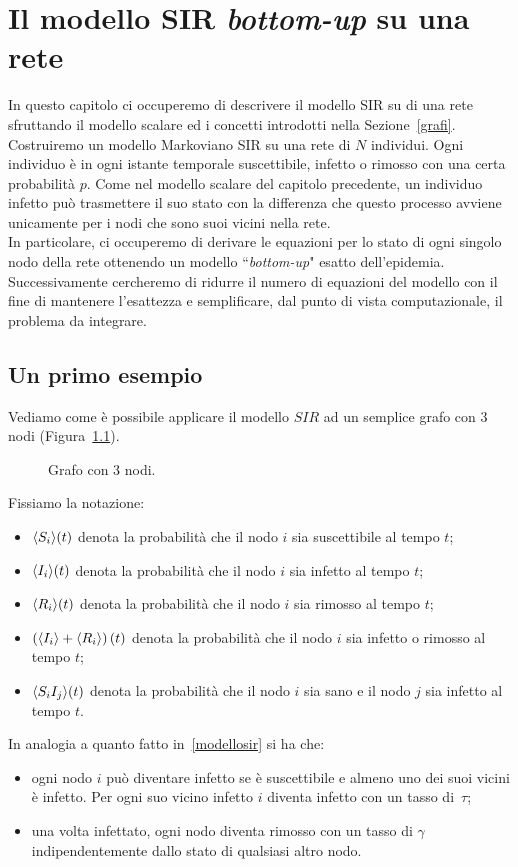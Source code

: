\chapter{Il modello SIR \textit{bottom-up} su una rete}
In questo capitolo ci occuperemo di descrivere il modello SIR su di una rete sfruttando il modello scalare ed i concetti introdotti nella Sezione~\ref{grafi}. Costruiremo un modello Markoviano SIR su una rete di $N$ individui. Ogni individuo \`e in ogni istante temporale suscettibile, infetto o rimosso con una certa probabilit\`a $p$. Come nel modello scalare del capitolo precedente, un individuo infetto pu\`o trasmettere il suo stato con la differenza che questo processo avviene unicamente per i nodi che sono suoi vicini nella rete.\\
In particolare, ci occuperemo di derivare le equazioni per lo stato di ogni singolo nodo della rete ottenendo un modello ``\textit{bottom-up}" esatto dell'epidemia. Successivamente cercheremo di ridurre il numero di equazioni del modello con il fine di mantenere l'esattezza e semplificare, dal punto di vista computazionale, il problema da integrare.  \section{Un primo esempio}
Vediamo come \`e possibile applicare il modello $SIR$ ad un semplice grafo con 3 nodi (Figura~\ref{fig::3nodi}).\\
\begin{figure}[ht]
\centering
{}	
\caption{Grafo con 3 nodi.}
\label{fig::3nodi}
\end{figure}

Fissiamo la notazione:
\begin{itemize}
	\item  $\langle S_i \rangle(t)$  denota la probabilit\`a che il nodo $i$ sia suscettibile al tempo $t$;
	\item   $\langle I_i \rangle(t)$  denota la probabilit\`a che il nodo $i$ sia infetto al tempo $t$;
	\item  $\langle R_i \rangle(t)$  denota la probabilit\`a che il nodo $i$ sia rimosso al tempo $t$;
	\item $\left(  \langle  I_i \rangle+ \langle  R_i \rangle \right)(t)$ denota la probabilit\`a che il nodo $i$ sia infetto o rimosso al tempo $t$;
	\item $\langle S_iI_j \rangle(t)$ denota la probabilit\`a che il nodo $i$ sia sano e il nodo $j$ sia infetto al tempo $t$.
	\end{itemize}
In analogia a quanto fatto in~\ref{modellosir} si ha che:
\begin{itemize}
	\item ogni nodo $i$ pu\`o diventare infetto se \`e suscettibile e almeno uno dei suoi vicini \`e infetto. Per ogni suo vicino infetto $i$ diventa infetto con un tasso di~$\tau$;
	\item una volta infettato, ogni nodo diventa rimosso con un tasso di $\gamma$ indipendentemente dallo stato di qualsiasi altro nodo.
\end{itemize}

